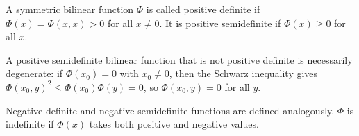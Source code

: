 A symmetric bilinear function $\Phi$ is called positive definite if $\Phi(x) = \Phi(x, x) > 0$ for all $x \neq 0$. It is positive semidefinite if $\Phi(x) \geq 0$ for all $x$.

A positive semidefinite bilinear function that is not positive definite is necessarily degenerate: if $\Phi(x_0) = 0$ with $x_0 \neq 0$, then the Schwarz inequality gives $\Phi(x_0, y)^2 \leq \Phi(x_0)\Phi(y) = 0$, so $\Phi(x_0, y) = 0$ for all $y$.

Negative definite and negative semidefinite functions are defined analogously. $\Phi$ is indefinite if $\Phi(x)$ takes both positive and negative values.
